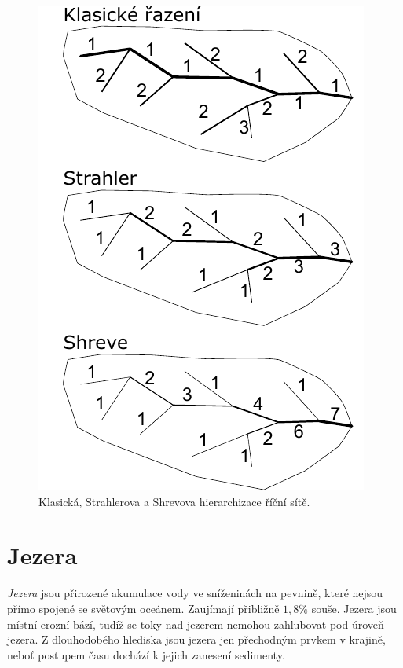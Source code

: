 \begin{figure}
	\centering
	\includegraphics[width=1\linewidth]{obrazky/fluvial/rad_toku}
	\caption{Klasická, Strahlerova a Shrevova hierarchizace říční sítě.}
	\label{fig:radtoku}
\end{figure}


\section{Jezera}
\emph{Jezera} jsou přirozené akumulace vody ve sníženinách na pevnině, které nejsou přímo spojené se světovým oceánem. Zaujímají přibližně $1,8 \%$ souše. Jezera jsou místní erozní bází, tudíž se toky nad jezerem nemohou zahlubovat pod úroveň jezera. Z dlouhodobého hlediska jsou jezera jen přechodným prvkem v krajině, neboť postupem času dochází k jejich zanesení sedimenty. 

